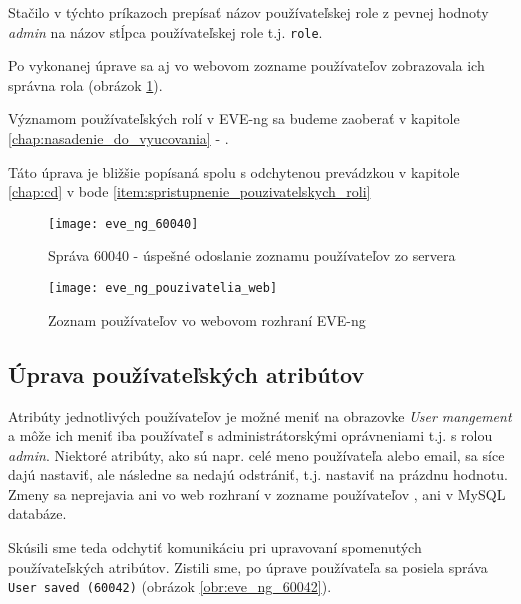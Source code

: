 Stačilo v týchto príkazoch prepísať názov používateľskej role z pevnej hodnoty \emph{admin} na názov stĺpca používateľskej role t.j. \texttt{role}.

Po vykonanej úprave sa aj vo webovom zozname používateľov zobrazovala ich správna rola (obrázok \ref{obr:eve_ng_pouzivatelia_web}).

Významom používateľských rolí v EVE-ng sa budeme zaoberať v kapitole \ref{chap:nasadenie_do_vyucovania} - .

Táto úprava je bližšie popísaná spolu s odchytenou prevádzkou v kapitole \ref{chap:cd} v bode \ref{item:spristupnenie_pouzivatelskych_roli}

\begin{figure}
    \centering
    \texttt{[image: eve\_ng\_60040]}
    \caption{Správa 60040 - úspešné odoslanie zoznamu používateľov zo servera}
    \label{obr:eve_ng_60040}
    
    \centering
    \texttt{[image: eve\_ng\_pouzivatelia\_web]}
    \caption{Zoznam používateľov vo webovom rozhraní EVE-ng}
    \label{obr:eve_ng_pouzivatelia_web}
\end{figure}






\subsection{Úprava používateľských atribútov}

Atribúty jednotlivých používateľov je možné meniť na obrazovke \emph{User mangement} a môže ich meniť iba používateľ s administrátorskými oprávneniami t.j. s rolou \emph{admin}. Niektoré atribúty, ako sú napr. celé meno používateľa alebo email, sa síce dajú nastaviť, ale následne sa nedajú odstrániť, t.j. nastaviť na prázdnu hodnotu. Zmeny sa neprejavia ani vo web rozhraní v zozname používateľov
, ani v MySQL databáze.

\begin{figure}
    
\end{figure}

Skúsili sme teda odchytiť komunikáciu pri upravovaní spomenutých používateľských atribútov. Zistili sme, po úprave používateľa sa posiela správa \texttt{User saved (60042)} (obrázok \ref{obr:eve_ng_60042}).

